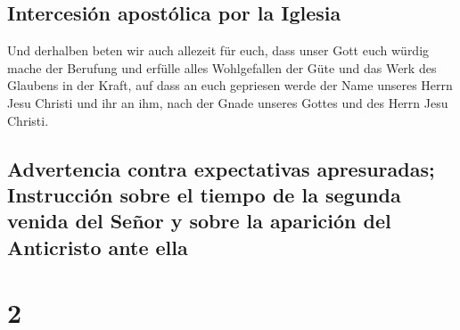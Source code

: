 \hypertarget{intercesiuxf3n-apostuxf3lica-por-la-iglesia}{%
\subsection{Intercesión apostólica por la
Iglesia}\label{intercesiuxf3n-apostuxf3lica-por-la-iglesia}}

 Und derhalben beten wir auch allezeit für euch, dass
unser Gott euch würdig mache der Berufung und erfülle alles Wohlgefallen
der Güte und das Werk des Glaubens in der Kraft,  auf
dass an euch gepriesen werde der Name unseres Herrn Jesu Christi und ihr
an ihm, nach der Gnade unseres Gottes und des Herrn Jesu Christi.

\hypertarget{advertencia-contra-expectativas-apresuradas-instrucciuxf3n-sobre-el-tiempo-de-la-segunda-venida-del-seuxf1or-y-sobre-la-apariciuxf3n-del-anticristo-ante-ella}{%
\subsection{Advertencia contra expectativas apresuradas; Instrucción
sobre el tiempo de la segunda venida del Señor y sobre la aparición del
Anticristo ante
ella}\label{advertencia-contra-expectativas-apresuradas-instrucciuxf3n-sobre-el-tiempo-de-la-segunda-venida-del-seuxf1or-y-sobre-la-apariciuxf3n-del-anticristo-ante-ella}}

\hypertarget{section-1}{%
\section{2}\label{section-1}}

